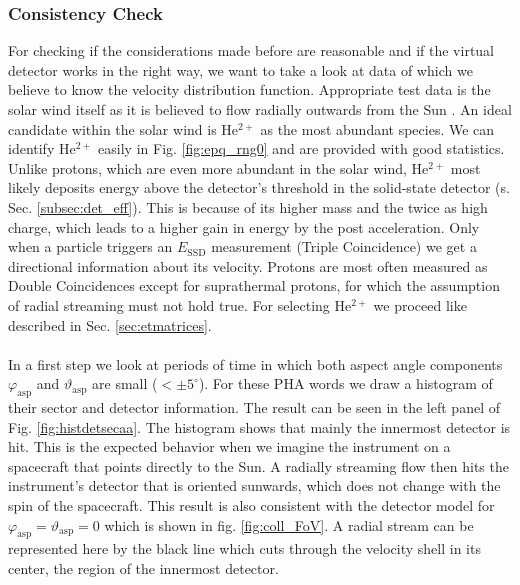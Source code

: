 \subsubsection{Consistency Check}
\label{sec:consis}
For checking if the considerations made before are reasonable and if the virtual detector works in the right way, we want to take a look at data of which we believe to know the velocity distribution function. Appropriate test data is the solar wind itself as it is believed to flow radially outwards from the Sun \citep[][,Ch. 6.1]{prlss_2004}. An ideal candidate within the solar wind is $\mathrm{He^{2+}}$ as the most abundant species. We can identify $\mathrm{He^{2+}}$ easily in Fig. \ref{fig:epq_rng0} and are provided with good statistics. Unlike protons, which are even more abundant in the solar wind, $\mathrm{He^{2+}}$ most likely deposits energy above the detector's threshold in the solid-state detector (s. Sec. \ref{subsec:det_eff}). This is because of its higher mass and the twice as high charge, which leads to a higher gain in energy by the post acceleration. Only when a particle triggers an $E_{\mathrm{SSD}}$ measurement (Triple Coincidence) we get a directional information about its velocity. Protons are most often measured as Double Coincidences except for suprathermal protons, for which the assumption of radial streaming must not hold true. For selecting $\mathrm{He^{2+}}$ we proceed like described in Sec. \ref{sec:etmatrices}.
\\ \\
In a first step we look at periods of time in which both aspect angle components $\varphi_{\mathrm{asp}}$ and $\vartheta_{\mathrm{asp}}$ are small ($<\pm5^\circ$). For these PHA words we draw a histogram of their sector and detector information. The result can be seen in the left panel of Fig. \ref{fig:histdetsecaa}. The histogram shows that mainly the innermost detector is hit. This is the expected behavior when we imagine the instrument on a spacecraft that points directly to the Sun. A radially streaming flow then hits the instrument's detector that is oriented sunwards, which does not change with the spin of the spacecraft. This result is also consistent with the detector model for $\varphi_{\mathrm{asp}} = \vartheta_{\mathrm{asp}} = 0$ which is shown in fig. \ref{fig:coll_FoV}. A radial stream can be represented here by the black line which cuts through the velocity shell in its center, the region of the innermost detector.
\\
